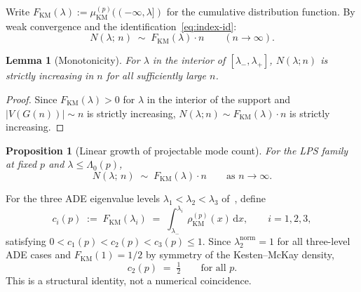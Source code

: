 \documentclass[12pt, a4paper]{article}
\theoremstyle{plain}
\newtheorem{proposition}{Proposition}[section]
\newtheorem{lemma}{Lemma}[section]
\theoremstyle{definition}
\theoremstyle{remark}
\begin{document}
      Write $F_{\mathrm{KM}}(\lambda) := \mu_{\mathrm{KM}}^{(p)}((-\infty, \lambda])$
      for the cumulative distribution function.
      By weak convergence and the identification~\eqref{eq:index-id}:
      \begin{equation}
        \label{eq:counting-linear}
        N(\lambda;\, n) \;\sim\; F_{\mathrm{KM}}(\lambda)\cdot n
        \qquad (n \to \infty).
      \end{equation}

      \begin{lemma}[Monotonicity]
        \label{lem:monotonicity}
        For $\lambda$ in the interior of $[\lambda_-, \lambda_+]$, $N(\lambda; n)$
        is strictly increasing in $n$ for all sufficiently large $n$.
      \end{lemma}

      \begin{proof}
        Since $F_{\mathrm{KM}}(\lambda) > 0$ for $\lambda$ in the interior of the
        support and $|V(G(n))| \sim n$ is strictly increasing,
        $N(\lambda;n) \sim F_{\mathrm{KM}}(\lambda)\cdot n$ is strictly increasing.
      \end{proof}

      \begin{proposition}[Linear growth of projectable mode count]
        \label{prop:Nproj-linear}
        For the LPS family at fixed $p$ and $\lambda \leq \Lambda_0(p)$,
        \begin{equation}
          \label{eq:Nproj-linear}
          N(\lambda;\, n) \;\sim\; F_{\mathrm{KM}}(\lambda)\cdot n
          \qquad \text{as } n \to \infty.
        \end{equation}
      \end{proposition}

      \noindent
      For the three ADE eigenvalue levels $\lambda_1 < \lambda_2 < \lambda_3$
      of~\cite{Beau2026a4}, define
      \begin{equation}
        \label{eq:KM-coefficients}
        c_i(p) \;:=\; F_{\mathrm{KM}}(\lambda_i)
        \;=\; \int_{\lambda_-}^{\lambda_i} \rho_{\mathrm{KM}}^{(p)}(x)\,\mathrm{d}x,
        \qquad i = 1,2,3,
      \end{equation}
      satisfying $0 < c_1(p) < c_2(p) < c_3(p) \leq 1$.
      Since $\lambda_2^{\mathrm{norm}} = 1$ for all three-level ADE cases and
      $F_{\mathrm{KM}}(1) = 1/2$ by symmetry of the Kesten--McKay density,
      \begin{equation}
        \label{eq:c2-universal}
        c_2(p) \;=\; \tfrac{1}{2}
        \qquad \text{for all } p.
      \end{equation}
      This is a structural identity, not a numerical coincidence.
\end{document}
